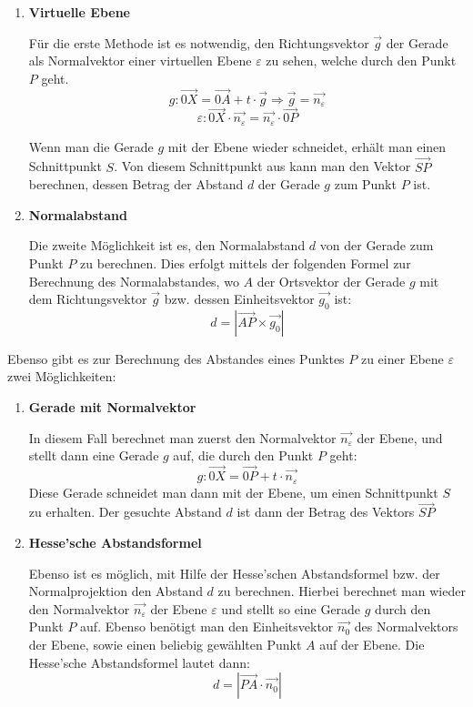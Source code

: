 \begin{enumerate}
  \item{\textbf{Virtuelle Ebene}}

  F\"{u}r die erste Methode ist es notwendig, den Richtungsvektor $\vec{g}$ der Gerade als Normalvektor einer virtuellen Ebene $\varepsilon$ zu sehen, welche durch den Punkt $P$ geht. $$g: \vec{0X} = \vec{0A} + t \cdot \vec{g} \Rightarrow \vec{g} = \vec{n_{\varepsilon}}$$ $$\varepsilon: \vec{0X} \cdot \vec{n_{\varepsilon}} = \vec{n_{\varepsilon}} \cdot \vec{0P}$$

  Wenn man die Gerade $g$ mit der Ebene wieder schneidet, erh\"{a}lt man einen Schnittpunkt $S$. Von diesem Schnittpunkt aus kann man den Vektor $\vec{SP}$ berechnen, dessen Betrag der Abstand $d$ der Gerade $g$ zum Punkt $P$ ist. 

  \item{\textbf{Normalabstand}}

  Die zweite M\"{o}glichkeit ist es, den Normalabstand $d$ von der Gerade zum Punkt $P$ zu berechnen. Dies erfolgt mittels der folgenden Formel zur Berechnung des Normalabstandes, wo $A$ der Ortsvektor der Gerade $g$ mit dem Richtungsvektor $\vec{g}$ bzw. dessen Einheitsvektor $\vec{g_{0}}$ ist: $$d = |\vec{AP} \times \vec{g_{0}}|$$

\end{enumerate}


Ebenso gibt es zur Berechnung des Abstandes eines Punktes $P$ zu einer Ebene $\varepsilon$ zwei M\"{o}glichkeiten:

\begin{enumerate}
  \item{\textbf{Gerade mit Normalvektor}}

  In diesem Fall berechnet man zuerst den Normalvektor $\vec{n_{\varepsilon}}$ der Ebene, und stellt dann eine Gerade $g$ auf, die durch den Punkt $P$ geht: $$g: \vec{0X} = \vec{0P} + t \cdot \vec{n_{\varepsilon}}$$ Diese Gerade schneidet man dann mit der Ebene, um einen Schnittpunkt $S$ zu erhalten. Der gesuchte Abstand $d$ ist dann der Betrag des Vektors $\vec{SP}$

  \item{\textbf{Hesse'sche Abstandsformel}}

  Ebenso ist es m\"{o}glich, mit Hilfe der Hesse'schen Abstandsformel bzw. der Normalprojektion den Abstand $d$ zu berechnen. Hierbei berechnet man wieder den Normalvektor $\vec{n_{\varepsilon}}$ der Ebene $\varepsilon$ und stellt so eine Gerade $g$ durch den Punkt $P$ auf. Ebenso ben\"{o}tigt man den Einheitsvektor $\vec{n_{0}}$ des Normalvektors der Ebene, sowie einen beliebig gew\"{a}hlten Punkt $A$ auf der Ebene. Die Hesse'sche Abstandsformel lautet dann: $$d = |\vec{PA} \cdot \vec{n_{0}}|$$

\end{enumerate}


